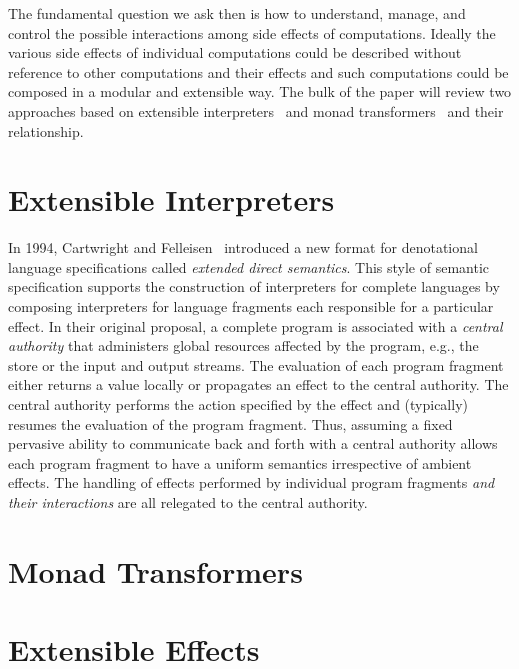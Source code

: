 \documentclass{llncs}
\begin{document}
The fundamental question we ask then is how to understand, manage, and
control the possible interactions among side effects of computations.
Ideally the various side effects of individual computations could be
described without reference to other computations and their effects
and such computations could be composed in a modular and extensible
way. The bulk of the paper will review two approaches based on
extensible interpreters~\cite{cartwright-extensible} and monad
transformers~\cite{liang-interpreter} and their relationship.

\section{Extensible Interpreters}

In 1994, Cartwright and Felleisen~\cite{cartwright-extensible}
introduced a new format for denotational language specifications
called \emph{extended direct semantics}. This style of semantic
specification supports the construction of interpreters for complete
languages by composing interpreters for language fragments each
responsible for a particular effect. In their original proposal, a
complete program is associated with a \emph{central authority} that
administers global resources affected by the program, e.g., the store
or the input and output streams. The evaluation of each program
fragment either returns a value locally or propagates an effect to the
central authority. The central authority performs the action specified
by the effect and (typically) resumes the evaluation of the program
fragment. Thus, assuming a fixed pervasive ability to communicate back
and forth with a central authority allows each program fragment to
have a uniform semantics irrespective of ambient effects. The handling
of effects performed by individual program fragments \emph{and their
  interactions} are all relegated to the central authority. 



\section{Monad Transformers}

\section{Extensible Effects}
\end{document}
